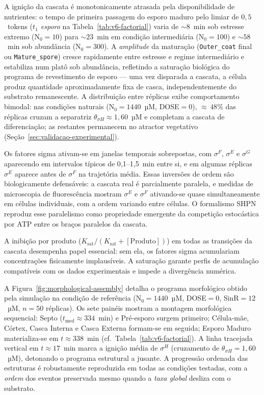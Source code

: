 A ignição da cascata é monotonicamente atrasada pela disponibilidade
de nutrientes: o tempo de primeira passagem do esporo maduro pelo
limiar de $0{,}5$~tokens (\textit{$t_1$ esporo} na Tabela~\ref{tab:v6-factorial})
varia de $\sim\!8$~min sob estresse extremo ($\text{N}_0=10$) para
$\sim\!23$~min em condição intermediária ($\text{N}_0=100$) e
$\sim\!58$~min sob abundância ($\text{N}_0=300$).
A \emph{amplitude} da maturação (\texttt{Outer\_coat} final ou
\texttt{Mature\_spore}) cresce rapidamente entre estresse e regime
intermediário e estabiliza num platô sob abundância, refletindo a
saturação biológica do programa de revestimento de esporo — uma vez
disparada a cascata, a célula produz quantidade aproximadamente fixa
de casca, independentemente do substrato remanescente.
A distribuição entre réplicas exibe comportamento bimodal: nas
condições naturais ($\text{N}_0 = 1440$~µM, DOSE$=0$), ${\approx}\,48\%$
das réplicas cruzam a separatriz $\theta_{\sigma H} \approx 1{,}60$~µM
e completam a cascata de diferenciação; as restantes permanecem no
atractor vegetativo (Seção~\ref{sec:validacao-experimental}).

Os fatores sigma ativam-se em janelas temporais sobrepostas, com
$\sigma^F$, $\sigma^E$ e $\sigma^G$ aparecendo em intervalos típicos
de 0{,}1--1{,}5~min entre si, e em algumas réplicas $\sigma^E$ aparece
antes de $\sigma^F$ na trajetória média.  Essas inversões de ordem
são biologicamente defensáveis: a cascata real é parcialmente paralela,
e medidas de microscopia de fluorescência mostram $\sigma^E$ e
$\sigma^F$ ativando-se quase simultaneamente em células individuais,
com a ordem variando entre células.  O formalismo SHPN reproduz esse
paralelismo como propriedade emergente da competição estocástica por
ATP entre os braços paralelos da cascata.

A inibição por produto
($K_{\text{sat}} / (K_{\text{sat}} + [\text{Produto}])$)
em todas as transições da cascata desempenha papel essencial: sem ela,
os fatores sigma acumulariam concentrações fisicamente implausíveis.
A saturação garante perfis de acumulação compatíveis com os dados
experimentais e impede a divergência numérica.

A Figura~\ref{fig:morphological-assembly} detalha o programa morfológico
obtido pela simulação na condição de referência
($\text{N}_0=1440$~µM, DOSE$=0$, SinR$=12$~µM, $n=50$ réplicas).
Os sete painéis mostram a montagem morfológica sequencial:
Septo ($t_{\text{med}} \approx 334$~min) e Pré-esporo surgem primeiro;
Célula-mãe, Córtex, Casca Interna e Casca Externa formam-se em seguida;
Esporo Maduro materializa-se em $t \approx 338$~min
(cf.\ Tabela~\ref{tab:v6-factorial}).
A linha tracejada vertical em $t \approx 17$~min marca a ignição média
de $\sigma^H$ (cruzamento de $\theta_{\sigma H}=1{,}60$~µM), detonando
o programa estrutural a jusante.
A progressão ordenada das estruturas é robustamente reproduzida em
todas as condições testadas, com a \emph{ordem} dos eventos preservada
mesmo quando a \emph{taxa global} desliza com o substrato.

